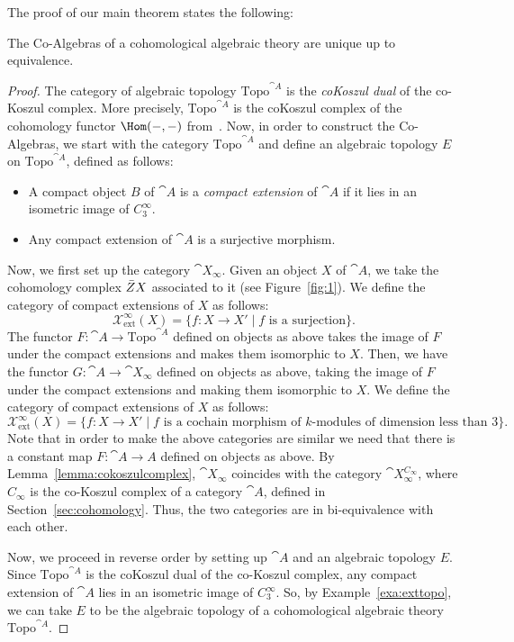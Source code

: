\documentclass[a4paper,reqno,oneside]{article}
\begin{document}
The proof of our main theorem states the following:
\begin{thm}
    The Co-Algebras of a cohomological algebraic theory are unique up to equivalence.
\end{thm}
\begin{proof}
    The category of algebraic topology $\mathrm{Topo}^{\cat{A}}$ is the \emph{coKoszul dual} of the co-Koszul complex. More precisely, $\mathrm{Topo}^{\cat{A}}$ is the coKoszul complex of the cohomology functor $\Hom(-,-)$ from~\cite{Nakayama1995}. Now, in order to construct the Co-Algebras, we start with the category $\mathrm{Topo}^{\cat{A}}$ and define an algebraic topology $E$ on $\mathrm{Topo}^{\cat{A}}$, defined as follows: 
    \begin{itemize}
        \item A compact object $B$ of $\cat{A}$ is a \emph{compact extension} of $\cat{A}$ if it lies in an isometric image of $C^{\infty}_{3}$. 
        \item Any compact extension of $\cat{A}$ is a surjective morphism.
    \end{itemize}
    Now, we first set up the category $\cat{X}_{\infty}$. Given an object $X$ of $\cat{A}$, we take the cohomology complex $\Bar{Z}X$ associated to it (see Figure~\ref{fig:1}). We define the category of compact extensions of $X$ as follows: 
    \[
    \mathcal{X}^{\infty}_{\mathrm{ext}}(X)=\{f:X\rightarrow X'\mid\text{$f$ is a surjection}\}.
    \]
    The functor $F:\cat{A}\rightarrow \mathrm{Topo}^{\cat{A}}$ defined on objects as above takes the image of $F$ under the compact extensions and makes them isomorphic to $X$. Then, we have the functor $G:\cat{A}\rightarrow\cat{X}_{\infty}$ defined on objects as above, taking the image of $F$ under the compact extensions and making them isomorphic to $X$. We define the category of compact extensions of $X$ as follows: 
    \[
    \mathcal{X}^{\infty}_{\mathrm{ext}}(X)=\{f:X\rightarrow X'\mid\text{$f$ is a cochain morphism of $k$-modules of dimension less than $3$}\}.
    \]
    Note that in order to make the above categories are similar we need that there is a constant map $F:\cat{A}\rightarrow A$ defined on objects as above. 
    By Lemma~\ref{lemma:cokoszulcomplex}, $\cat{X}_{\infty}$ coincides with the category $\cat{X}_{\infty}^{C_{\infty}}$, where $C_{\infty}$ is the co-Koszul complex of a category $\cat{A}$, defined in Section~\ref{sec:cohomology}. Thus, the two categories are in bi-equivalence with each other.

    Now, we proceed in reverse order by setting up $\cat{A}$ and an algebraic topology $E$. Since $\mathrm{Topo}^{\cat{A}}$ is the coKoszul dual of the co-Koszul complex, any compact extension of $\cat{A}$ lies in an isometric image of $C^{\infty}_{3}$. So, by Example~\ref{exa:exttopo}, we can take $E$ to be the algebraic topology of a cohomological algebraic theory $\mathrm{Topo}^{\cat{A}}$. 


\end{proof}
\end{document}
